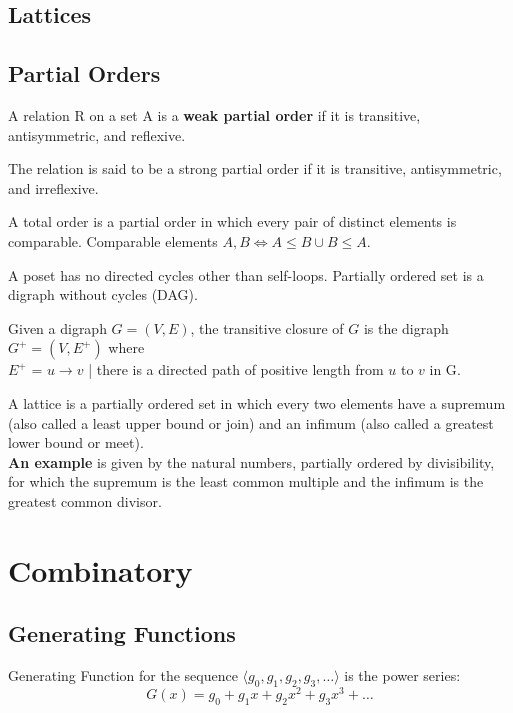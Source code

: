 \documentclass[a4paper,oneside]{book}
\begin{document}
\chapter{Lattices}
\chapter{Partial Orders}
\begin{definition}
A relation R on a set A is a \textbf{weak partial order} if it is transitive, antisymmetric, and reflexive.
\end{definition}
\begin{definition}
The relation is said to be a strong partial order if it is transitive, antisymmetric, and irreflexive.
\end{definition}
\begin{definition}
A total order is a partial order in which every pair of distinct elements is comparable. Comparable elements $A, B \iff A \le B \cup B \le A$.
\end{definition}
\begin{theorem}
A poset has no directed cycles other than self-loops. Partially ordered set is a digraph without cycles (DAG).
\end{theorem}
\begin{definition}
Given a digraph $G = (V, E)$, the transitive closure of $G$ is the digraph $G^+ = (V, E^+)$ where \\ $E^+$ = {$u \to v$ | there is a directed path of positive length from $u$ to $v$ in G}.
\end{definition}
\begin{definition}[Lattices]
A lattice is a partially ordered set in which every two elements have a supremum (also called a least upper bound or join) and an infimum (also called a greatest lower bound or meet).\\ \textbf{An example} is given by the natural numbers, partially ordered by divisibility, for which the supremum is the least common multiple and the infimum is the greatest common divisor.
\end{definition}






\part{Combinatory}
\chapter{Generating Functions}
\begin{definition}
Generating Function for the sequence $\langle g_0, g_1, g_2, g_3, \ldots \rangle$ is the power series:
$$ G(x) = g_0 + g_1x + g_2x^2 + g_3x^3 + \ldots $$
\end{definition}
\end{document}
